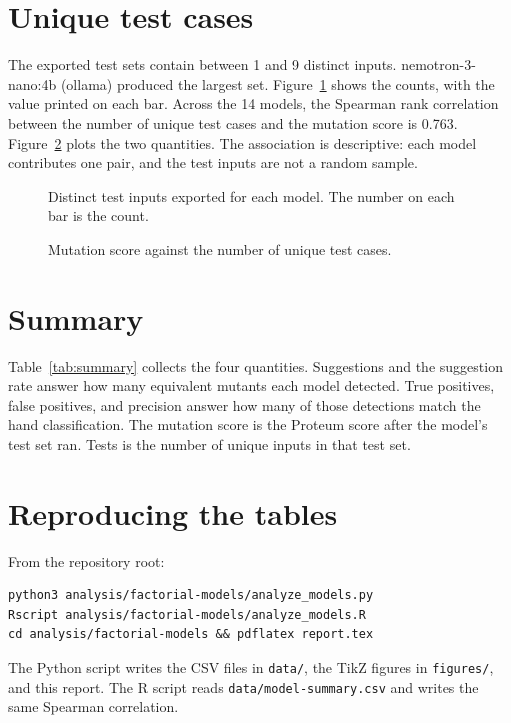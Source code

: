 \documentclass[11pt]{article}
\begin{document}
\section{Unique test cases}

The exported test sets contain between 1 and 9 distinct inputs. nemotron-3-nano:4b (ollama) produced the largest set. Figure~\ref{fig:tests} shows the counts, with the value printed on each bar. Across the 14 models, the Spearman rank correlation between the number of unique test cases and the mutation score is 0.763. Figure~\ref{fig:scatter} plots the two quantities. The association is descriptive: each model contributes one pair, and the test inputs are not a random sample.

\begin{figure}[ht]
\centering

\caption{Distinct test inputs exported for each model. The number on each bar is the count.}
\label{fig:tests}
\end{figure}

\begin{figure}[ht]
\centering

\caption{Mutation score against the number of unique test cases.}
\label{fig:scatter}
\end{figure}

\section{Summary}

Table~\ref{tab:summary} collects the four quantities. Suggestions and the suggestion rate answer how many equivalent mutants each model detected. True positives, false positives, and precision answer how many of those detections match the hand classification. The mutation score is the Proteum score after the model's test set ran. Tests is the number of unique inputs in that test set.

\begin{table}[ht]
\centering
\caption{Equivalence suggestions, precision, mutation score, and unique tests. Rate and precision are percentages.}
\label{tab:summary}
\scriptsize

\end{table}

\appendix
\section{Reproducing the tables}

From the repository root:

\begin{verbatim}
python3 analysis/factorial-models/analyze_models.py
Rscript analysis/factorial-models/analyze_models.R
cd analysis/factorial-models && pdflatex report.tex
\end{verbatim}

The Python script writes the CSV files in \texttt{data/}, the TikZ figures in \texttt{figures/}, and this report. The R script reads \texttt{data/model-summary.csv} and writes the same Spearman correlation.
\end{document}
